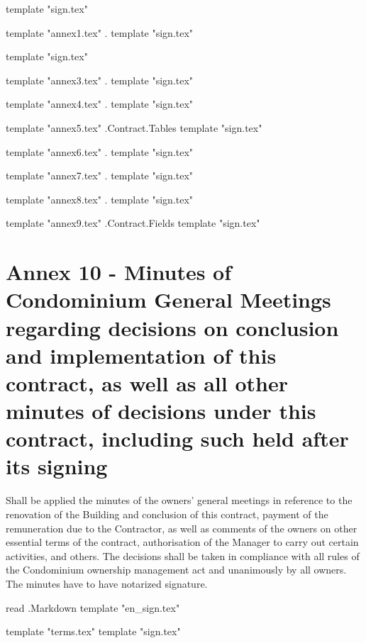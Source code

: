\vspace{2cm}
{{template "sign.tex"}} %

{{template "annex1.tex" .}} %
{{template "sign.tex"}} %

{{template "sign.tex"}} %

{{template "annex3.tex" .}} %
{{template "sign.tex"}} %

{{template "annex4.tex" .}} %
{{template "sign.tex"}} %

{{template "annex5.tex" .Contract.Tables}} %
{{template "sign.tex"}} %

{{template "annex6.tex" .}} %
{{template "sign.tex"}} %

{{template "annex7.tex" .}} %
{{template "sign.tex"}} %

{{template "annex8.tex" .}} %
{{template "sign.tex"}} %

{{template "annex9.tex" .Contract.Fields}} %
{{template "sign.tex"}} %

\pagebreak
\section{Annex 10 {-} Minutes of Condominium General Meetings regarding decisions on conclusion and implementation of this contract, as well as all other minutes of decisions under this contract, including such held after its signing}

Shall be applied the minutes of the owners’ general meetings in reference to the renovation of the Building and conclusion of this contract, payment of the remuneration due to the Contractor, as well as comments of the owners on other essential terms of the contract, authorisation of the Manager to carry out certain activities, and others. The decisions shall be taken in compliance with all rules of the Condominium ownership management act and unanimously by all owners. The minutes have to have notarized signature.

\vspace{2cm}
{{read .Markdown}} %
{{template "en_sign.tex"}} %
\FloatBarrier{}\mbox{}\vfill\pagebreak %

{{template "terms.tex"}} %
{{template "sign.tex"}} %

